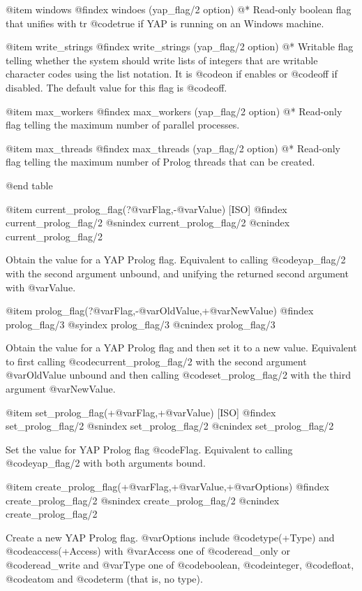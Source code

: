 {{{{{{{{{@item  windows
@findex windoes (yap_flag/2 option)
@* 
Read-only boolean flag that unifies with tr @code{true} if YAP is
running on an Windows machine.

@item write_strings
@findex  write_strings (yap_flag/2 option)
@* Writable flag telling whether the system should write lists of
integers that are writable character codes using the list notation. It
is @code{on} if enables or @code{off} if disabled. The default value for
this flag is @code{off}.

@item max_workers
@findex  max_workers (yap_flag/2 option)
@* Read-only flag telling the maximum number of parallel processes.

@item max_threads
@findex  max_threads (yap_flag/2 option)
@* Read-only flag telling the maximum number of Prolog threads that can 
be created.

@end table

@item current_prolog_flag(?@var{Flag},-@var{Value}) [ISO]
@findex current_prolog_flag/2
@snindex current_prolog_flag/2
@cnindex current_prolog_flag/2

Obtain the value for a YAP Prolog flag. Equivalent to calling
@code{yap_flag/2} with the second argument unbound, and unifying the
returned second argument with @var{Value}.

@item prolog_flag(?@var{Flag},-@var{OldValue},+@var{NewValue})
@findex prolog_flag/3
@syindex prolog_flag/3
@cnindex prolog_flag/3

Obtain the value for a YAP Prolog flag and then set it to a new
value. Equivalent to first calling @code{current_prolog_flag/2} with the
second argument @var{OldValue} unbound and then calling
@code{set_prolog_flag/2} with the third argument @var{NewValue}.

@item set_prolog_flag(+@var{Flag},+@var{Value}) [ISO]
@findex set_prolog_flag/2
@snindex set_prolog_flag/2
@cnindex set_prolog_flag/2

Set the value for YAP Prolog flag @code{Flag}. Equivalent to
calling @code{yap_flag/2} with both arguments bound.


@item create_prolog_flag(+@var{Flag},+@var{Value},+@var{Options})
@findex create_prolog_flag/2
@snindex create_prolog_flag/2
@cnindex create_prolog_flag/2

Create a new YAP Prolog flag. @var{Options} include @code{type(+Type)} and @code{access(+Access)} with @var{Access}
one of @code{read_only} or @code{read_write} and @var{Type} one of @code{boolean}, @code{integer}, @code{float}, @code{atom}
and @code{term} (that is, no type).

}}}}}}}}}
